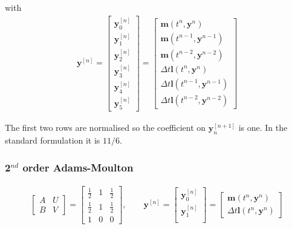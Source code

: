 with
\begin{align*}
  \boldsymbol{y}^{[n]}=
  \left[\begin{array}{l}
  \boldsymbol{y}^{[n]}_0 \\
  \boldsymbol{y}^{[n]}_1 \\
  \boldsymbol{y}^{[n]}_2 \\
  \boldsymbol{y}^{[n]}_3 \\
  \boldsymbol{y}^{[n]}_4 \\
  \boldsymbol{y}^{[n]}_5
  \end{array}\right]=
  \left[\begin{array}{l}
  \boldsymbol{m}\left(t^n,\boldsymbol{y}^{n}\right)\\
  \boldsymbol{m}\left(t^{n-1},\boldsymbol{y}^{n-1}\right)\\
  \boldsymbol{m}\left(t^{n-2},\boldsymbol{y}^{n-2}\right)\\
  \Delta t \boldsymbol{l}\left ( t^n, \boldsymbol{y}^{n}\right)\\
  \Delta t \boldsymbol{l}\left ( t^{n-1}, \boldsymbol{y}^{n-1}\right)\\
  \Delta t \boldsymbol{l}\left ( t^{n-2}, \boldsymbol{y}^{n-2}\right)
  \end{array}\right]
\end{align*}

\begin{notebox}
The first two rows are normalised so the coefficient on
$\boldsymbol{y}_n^{[n+1]}$ is one. In the standard formulation it is $11/6$.
\end{notebox}

\subsubsection{2$^{nd}$ order Adams-Moulton}
\begin{align*}
  \left[\begin{array}{c|c}
  A & U \\
  \hline
  B & V
  \end{array}\right] =
  \left[\begin{array}{c|cc}
  \frac{1}{2} & 1 & \frac{1}{2} \\
  \hline
  \frac{1}{2} & 1 & \frac{1}{2} \\
  1 & 0 & 0
  \end{array}\right],\qquad
  \boldsymbol{y}^{[n]}=
  \left[\begin{array}{c}
  \boldsymbol{y}^{[n]}_0\\
  \boldsymbol{y}^{[n]}_1\\
  \end{array}\right]=
  \left[\begin{array}{c}
  \boldsymbol{m}\left(t^n,\boldsymbol{y}^{n}\right)\\
  \Delta t \boldsymbol{l}(t^{n},\boldsymbol{y}^{n})
  \end{array}\right]
\end{align*}


